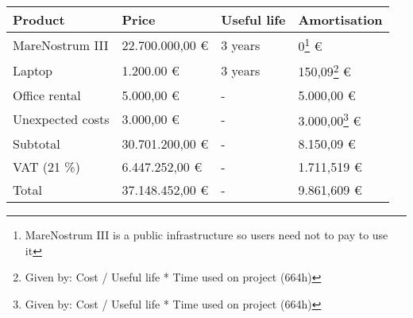\begin{center}
	\begin{tabular}{| R{4cm} | C{3cm} | C{2cm} | C{3cm} |}
	\hline
	Product & Price & Useful life & Amortisation \\ 
	\hline \hline
	MareNostrum III & 22.700.000,00 \euro & 3 years & 0\footnote{ MareNostrum III is a public infrastructure so users need not to pay to use it} \euro \\
	\hline
	Laptop & 1.200.00 \euro & 3 years & 150,09\footnote{ Given by: Cost / Useful life * Time used on project (664h)} \euro \\
	\hline
	Office rental & 5.000,00 \euro & - & 5.000,00 \euro \\
	\hline
	Unexpected costs & 3.000,00 \euro & - & 3.000,00\footnote{ Given by: Cost / Useful life * Time used on project (664h)} \euro \\
	\hline
	\hline
	Subtotal & 30.701.200,00 \euro & - & 8.150,09 \euro \\
	\hline
	VAT (21 \%) & 6.447.252,00 \euro & - & 1.711,519 \euro \\
	\hline
	\hline
	Total & 37.148.452,00 \euro & - & 9.861,609 \euro \\
	\hline
	\end{tabular}
\end{center}
